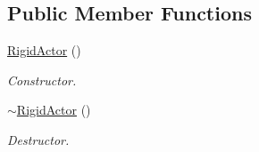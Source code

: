 \subsection*{Public Member Functions}
\begin{DoxyCompactItemize}
\item 
\hypertarget{classContent_1_1Actor_1_1Physics_1_1PhysX_1_1RigidActor_a6d92ae82707e9b767d434c3afeeba8fc}{
\hyperlink{classContent_1_1Actor_1_1Physics_1_1PhysX_1_1RigidActor_a6d92ae82707e9b767d434c3afeeba8fc}{RigidActor} ()}
\label{classContent_1_1Actor_1_1Physics_1_1PhysX_1_1RigidActor_a6d92ae82707e9b767d434c3afeeba8fc}

\begin{DoxyCompactList}\small\item\em Constructor. \item\end{DoxyCompactList}\item 
\hypertarget{classContent_1_1Actor_1_1Physics_1_1PhysX_1_1RigidActor_a92b99e73a55b0a6c9168565090eb363a}{
\hyperlink{classContent_1_1Actor_1_1Physics_1_1PhysX_1_1RigidActor_a92b99e73a55b0a6c9168565090eb363a}{$\sim$RigidActor} ()}
\label{classContent_1_1Actor_1_1Physics_1_1PhysX_1_1RigidActor_a92b99e73a55b0a6c9168565090eb363a}

\begin{DoxyCompactList}\small\item\em Destructor. \item\end{DoxyCompactList}\end{DoxyCompactItemize}
